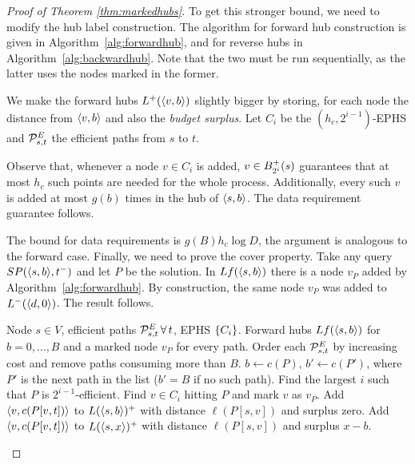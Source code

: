 \begin{proof}[Proof of Theorem \ref{thm:markedhubs}]
To get this stronger bound, we need to modify the hub label construction. The algorithm for forward hub construction is given in Algorithm~\ref{alg:forwardhub}, and for reverse hubs in Algorithm~\ref{alg:backwardhub}. Note that the two must be run sequentially, as the latter uses the nodes marked in the former.


We make the forward hubs $\Lf(\pp{v,b})$ slightly bigger by storing, for each node the distance from $\pp{v,b}$ and also the \emph{budget surplus}.
Let $C_i$ be the $(h_c,2^{i-1})$-EPHS and $\PE_{s,t}$ the efficient paths from $s$ to $t$.

Observe that, whenever a node $v\in C_i$ is added, $v\in \Bf_{2^i}(s)$ guarantees that at most $h_c$ such points are needed for the whole process.
Additionally, every such $v$ is added at most $g(b)$ times in the hub of $\pp{s,b}$.
The data requirement guarantee follows.

The bound for data requirements is $g(B) h_c\log D$, the argument is analogous to the forward case.
Finally, we need to prove the cover property.
Take any query $SP(\pp{s,b},t^-)$ and let $P$ be the solution.
In $Lf(\pp{s,b})$ there is a node $v_P$ added by Algorithm~\ref{alg:forwardhub}.
By construction, the same node $v_P$ was added to $\Lb(\pp{d,0})$. The result follows.


\begin{algorithm}[!h]
\caption{Construction of forward hub}
\label{alg:forwardhub}
\begin{algorithmic}[1]
\Require Node $s\in V$, efficient paths $\PE_{s,t}\,\forall\,t$, EPHS $\crl*{C_i}$.
\Ensure Forward hubs $Lf(\pp{s,b})$ for $b=0,\ldots,B$ and a marked node $v_P$ for every path.
\State Order each $\PE_{s,t}$ by increasing cost and remove paths consuming more than $B$.
		\State $b\gets c(P)$, $b'\gets c(P')$, where $P'$ is the next path in the list ($b'=B$ if no such path).
		\State Find the largest $i$ such that $P$ is $2^{i-1}$-efficient.
		\State Find $v\in C_i$ hitting $P$ and mark $v$ as $v_P$.
		\State Add $\pp{v,c(P[v,t])}$ to $L(\pp{s,b})^+$  with distance $\ell(P[s,v])$ and surplus zero.
			\State Add $\pp{v,c(P[v,t])}$ to $L(\pp{s,x})^+$  with distance $\ell(P[s,v])$ and surplus $x-b$.
		\EndFor
	\EndFor
\EndFor
\end{algorithmic}
\end{algorithm}


\end{proof}
